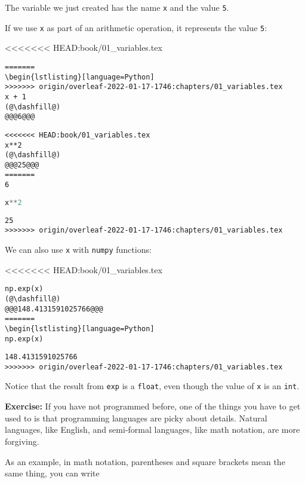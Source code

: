 The variable we just created has the name \passthrough{\lstinline!x!}
and the value \passthrough{\lstinline!5!}.

If we use \passthrough{\lstinline!x!} as part of an arithmetic
operation, it represents the value \passthrough{\lstinline!5!}:

<<<<<<< HEAD:book/01_variables.tex
\begin{lstlisting}[]
=======
\begin{lstlisting}[language=Python]
>>>>>>> origin/overleaf-2022-01-17-1746:chapters/01_variables.tex
x + 1
(@\dashfill@)
@@@6@@@
\end{lstlisting}

\begin{lstlisting}[]
<<<<<<< HEAD:book/01_variables.tex
x**2
(@\dashfill@)
@@@25@@@
=======
6
\end{lstlisting}

\begin{lstlisting}[language=Python]
x**2
\end{lstlisting}

\begin{lstlisting}[]
25
>>>>>>> origin/overleaf-2022-01-17-1746:chapters/01_variables.tex
\end{lstlisting}

We can also use \passthrough{\lstinline!x!} with
\passthrough{\lstinline!numpy!} functions:

<<<<<<< HEAD:book/01_variables.tex
\begin{lstlisting}[]
np.exp(x)
(@\dashfill@)
@@@148.4131591025766@@@
=======
\begin{lstlisting}[language=Python]
np.exp(x)
\end{lstlisting}

\begin{lstlisting}[]
148.4131591025766
>>>>>>> origin/overleaf-2022-01-17-1746:chapters/01_variables.tex
\end{lstlisting}

Notice that the result from \passthrough{\lstinline!exp!} is a
\passthrough{\lstinline!float!}, even though the value of
\passthrough{\lstinline!x!} is an \passthrough{\lstinline!int!}.

\textbf{Exercise:} If you have not programmed before, one of the things
you have to get used to is that programming languages are picky about
details. Natural languages, like English, and semi-formal languages,
like math notation, are more forgiving.

As an example, in math notation, parentheses and square brackets mean
the same thing, you can write

